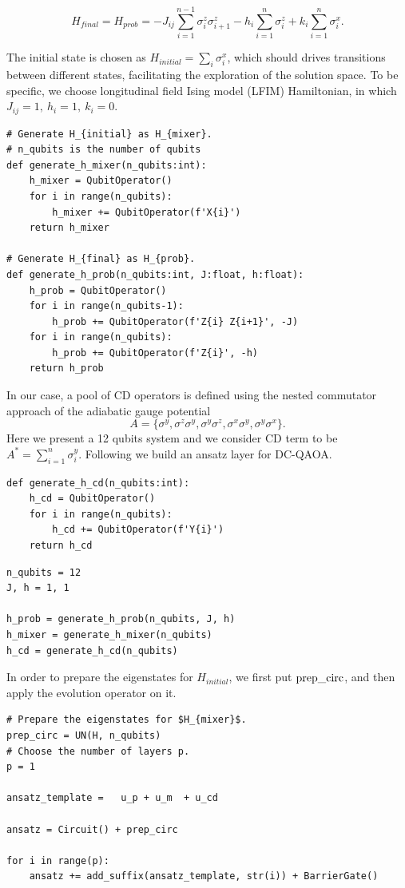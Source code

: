 \begin{equation}
    H_{final} = H_{prob} = -J_{ij}\sum_{i=1}^{n-1}\sigma^z_i\sigma^z_{i+1}-h_{i}\sum_{i=1}^{n}{\sigma_i^z} + k_{i}\sum_{i=1}^{n}\sigma_{i}^{x}.
\end{equation}

The initial state is chosen as $H_{initial} = \sum_{i}\sigma_{i}^{x}$, which should drives transitions between different states, facilitating the exploration of the solution space. To be specific, we choose longitudinal field Ising model (LFIM) Hamiltonian, in which $J_{ij}=1,~h_{i}=1,~k_{i}=0$.
\begin{lstlisting}
# Generate H_{initial} as H_{mixer}.
# n_qubits is the number of qubits
def generate_h_mixer(n_qubits:int):
    h_mixer = QubitOperator()
    for i in range(n_qubits):
        h_mixer += QubitOperator(f'X{i}')
    return h_mixer

# Generate H_{final} as H_{prob}.
def generate_h_prob(n_qubits:int, J:float, h:float):
    h_prob = QubitOperator()
    for i in range(n_qubits-1):
        h_prob += QubitOperator(f'Z{i} Z{i+1}', -J)
    for i in range(n_qubits):
        h_prob += QubitOperator(f'Z{i}', -h)
    return h_prob
\end{lstlisting}

In our case,  a pool of CD operators is defined using the nested commutator approach of the adiabatic gauge potential~\cite{PhysRevResearch.6.013147}
$$A = \{\sigma^{y},\sigma^{z}\sigma^{y}, \sigma^{y}\sigma^{z}, \sigma^{x}\sigma^{y}, \sigma^{y}\sigma^{x} \}.$$
Here we present a 12 qubits system and we consider CD term to be  $A^{*} = \sum_{i=1}^{n}\sigma_{i}^{y}$. Following we build an ansatz layer for DC-QAOA.
\begin{lstlisting}
def generate_h_cd(n_qubits:int):
    h_cd = QubitOperator()
    for i in range(n_qubits):
        h_cd += QubitOperator(f'Y{i}')
    return h_cd
\end{lstlisting}

\begin{lstlisting}
n_qubits = 12
J, h = 1, 1

h_prob = generate_h_prob(n_qubits, J, h)
h_mixer = generate_h_mixer(n_qubits)
h_cd = generate_h_cd(n_qubits)
\end{lstlisting}

In order to prepare the eigenstates for $H_{initial}$, we first put ${\rm prep\_circ}$, and then apply the evolution operator on it.
\begin{lstlisting}
# Prepare the eigenstates for $H_{mixer}$.
prep_circ = UN(H, n_qubits)
# Choose the number of layers p.
p = 1

ansatz_template =   u_p + u_m  + u_cd

ansatz = Circuit() + prep_circ

for i in range(p):
    ansatz += add_suffix(ansatz_template, str(i)) + BarrierGate()
\end{lstlisting}

